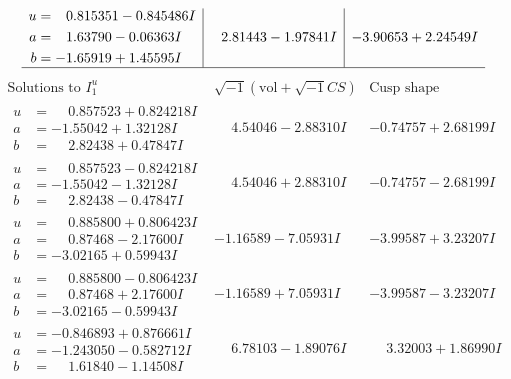\documentclass[1p]{elsarticle_modified}
\theoremstyle{definition}
\newcommand{\I}{\sqrt{-1}}
\begin{document}
$$\begin{array}{c|c|c}
\begin{aligned}
u &= \phantom{-}0.815351 - 0.845486 I \\
a &= \phantom{-}1.63790 - 0.06363 I \\
b &= -1.65919 + 1.45595 I\end{aligned}
 & \phantom{-}2.81443 - 1.97841 I & -3.90653 + 2.24549 I\\
 \hline 
 \end{array}$$\newpage$$\begin{array}{c|c|c}  
\text{Solutions to }I^u_{1}& \I (\text{vol} + \sqrt{-1}CS) & \text{Cusp shape}\\
 \hline 
\begin{aligned}
u &= \phantom{-}0.857523 + 0.824218 I \\
a &= -1.55042 + 1.32128 I \\
b &= \phantom{-}2.82438 + 0.47847 I\end{aligned}
 & \phantom{-}4.54046 - 2.88310 I & -0.74757 + 2.68199 I \\ \hline\begin{aligned}
u &= \phantom{-}0.857523 - 0.824218 I \\
a &= -1.55042 - 1.32128 I \\
b &= \phantom{-}2.82438 - 0.47847 I\end{aligned}
 & \phantom{-}4.54046 + 2.88310 I & -0.74757 - 2.68199 I \\ \hline\begin{aligned}
u &= \phantom{-}0.885800 + 0.806423 I \\
a &= \phantom{-}0.87468 - 2.17600 I \\
b &= -3.02165 + 0.59943 I\end{aligned}
 & -1.16589 - 7.05931 I & -3.99587 + 3.23207 I \\ \hline\begin{aligned}
u &= \phantom{-}0.885800 - 0.806423 I \\
a &= \phantom{-}0.87468 + 2.17600 I \\
b &= -3.02165 - 0.59943 I\end{aligned}
 & -1.16589 + 7.05931 I & -3.99587 - 3.23207 I \\ \hline\begin{aligned}
u &= -0.846893 + 0.876661 I \\
a &= -1.243050 - 0.582712 I \\
b &= \phantom{-}1.61840 - 1.14508 I\end{aligned}
 & \phantom{-}6.78103 - 1.89076 I & \phantom{-}3.32003 + 1.86990 I \\ \hline\begin{aligned}

\end{aligned}
\end{array}$$
\end{document}
